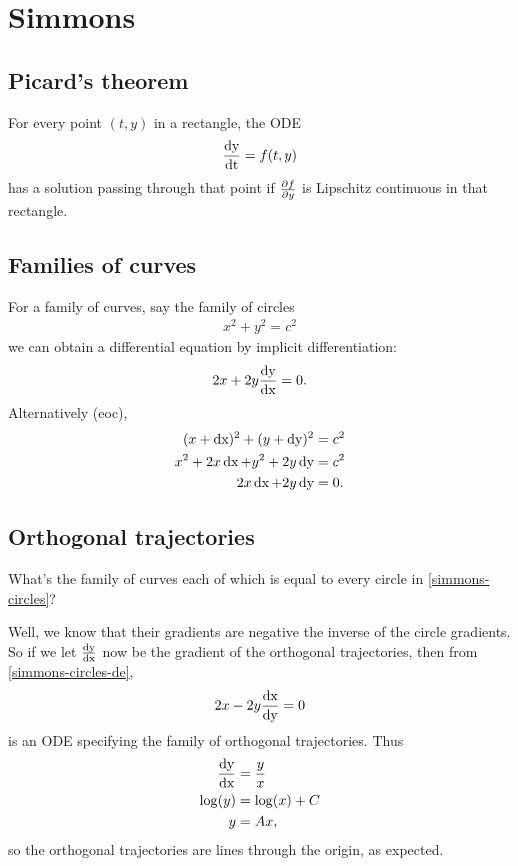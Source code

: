 \newpage
\section{Simmons}

\subsection{Picard's theorem}
For every point $(t, y)$ in a rectangle, the ODE
\begin{align*}
  \frac{\operatorname{\text{dy}}}{\operatorname{\text{dt}}} = f(t, y)
\end{align*}
has a solution passing through that point if $\frac{\partial f}{\partial y}$ is Lipschitz
continuous in that rectangle.

\subsection{Families of curves}
For a family of curves, say the family of circles
\begin{align}
  x^2 + y^2 = c^2 \label{simmons-circles}
\end{align}
we can obtain a differential equation by implicit differentiation:
\begin{align}
  2x + 2y\frac{\operatorname{\text{dy}}}{\operatorname{\text{dx}}} = 0. \label{simmons-circles-de}
\end{align}
Alternatively (eoc),
\begin{align*}
  (x + \operatorname{\text{dx}})^2 + (y + \operatorname{\text{dy}})^2 &= c^2\\
  x^2 + 2x\operatorname{\text{dx}} + y^2 + 2y\operatorname{\text{dy}} &= c^2\\
        2x\operatorname{\text{dx}}  + 2y\operatorname{\text{dy}}     &= 0.
\end{align*}

\subsection{Orthogonal trajectories}
What's the family of curves each of which is equal to every circle in \eqref{simmons-circles}?

Well, we know that their gradients are negative the inverse of the circle
gradients. So if we let $\frac{\operatorname{\text{dy}}}{\operatorname{\text{dx}}}$ now be the gradient of the orthogonal
trajectories, then from \eqref{simmons-circles-de},
\begin{align*}
  2x - 2y\frac{\operatorname{\text{dx}}}{\operatorname{\text{dy}}} = 0
\end{align*}
is an ODE specifying the family of orthogonal trajectories. Thus
\begin{align*}
  \frac{\operatorname{\text{dy}}}{\operatorname{\text{dx}}} &= \frac{y}{x}\\
  \log(y) &= \log(x) + C\\
       y &= Ax,
\end{align*}
so the orthogonal trajectories are lines through the origin, as expected.

